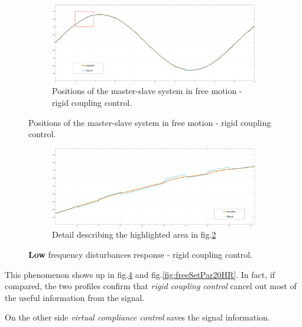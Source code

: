 \begin{figure}[H]
	\begin{subfigure}{1\linewidth}
		\centering
		\includegraphics[width=\textwidth, height=0.48\textwidth]{Images/freerigidTot20HtznoiseRect}
		\caption{Positions of the master-slave system in free motion - rigid coupling control.}
		\label{fig:freeRigTot20HR}
	\end{subfigure}	
\end{figure}
\begin{figure}\ContinuedFloat
	\begin{subfigure}{1\linewidth}
		\centering
		\includegraphics[width=\textwidth, height=0.48\textwidth]{Images/freerigidPart20Htznoise}
		\caption{Detail describing the highlighted area in fig.\ref{fig:freeRigTot20HR}}
		\label{fig:freeRigPar20HR}
	\end{subfigure}	
 \caption{\textbf{Low} frequency disturbances response - rigid coupling control.}
\end{figure}

This phenomenon shows up in fig.\ref{fig:freeRigPar20HR} and fig.\ref{fig:freeSetPar20HR}. In fact, if compared, the two profiles confirm that \textsl{rigid coupling control} cancel out most of the useful information from the signal.

On the other side \textsl{virtual compliance control} saves the signal information.

